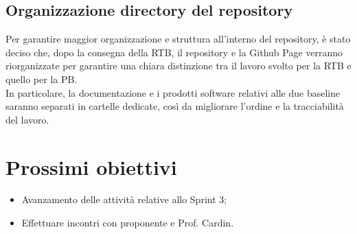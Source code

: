 \subsection{Organizzazione directory del repository}
Per garantire maggior organizzazione e struttura all'interno del repository, è stato deciso che, dopo la consegna della RTB, il repository e la Github Page verranno riorganizzate per garantire una chiara distinzione tra il lavoro svolto per la RTB e quello per la PB. \\In particolare, la documentazione e i prodotti software relativi alle due baseline saranno separati in cartelle dedicate, così da migliorare l'ordine e la tracciabilità del lavoro.

\section{Prossimi obiettivi}
   \begin{itemize}
        \item Avanzamento delle attività relative allo Sprint 3;
        \item Effettuare incontri con proponente e Prof. Cardin.
    \end{itemize}